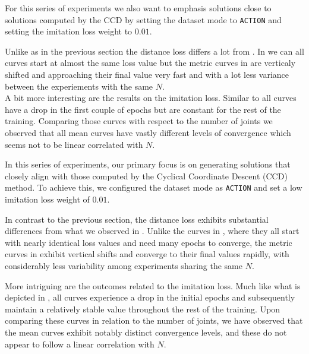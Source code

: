 For this series of experiments we also want to emphasis solutions close to solutions computed by the CCD by setting the dataset mode to \texttt{ACTION} and setting the imitation loss weight to $0.01$. 

Unlike as in the previous section the distance loss differs a lot from . In  we can all curves start at almost the same loss value but the metric curves in  are verticaly shifted and approaching their final value very fast and with a lot less variance between the experiements with the same $N$.\\
A bit more interesting are the results on the imitation loss. Similar to  all curves have a drop in the first couple of epochs but are constant for the rest of the training. Comparing those curves with respect to the number of joints we observed that all mean curves have vastly different levels of convergence which seems not to be linear correlated with $N$.


In this series of experiments, our primary focus is on generating solutions that closely align with those computed by the Cyclical Coordinate Descent (CCD) method. To achieve this, we configured the dataset mode as \texttt{ACTION} and set a low imitation loss weight of $0.01$.

In contrast to the previous section, the distance loss exhibits substantial differences from what we observed in . Unlike the curves in , where they all start with nearly identical loss values and need many epochs to converge, the metric curves in  exhibit vertical shifts and converge to their final values rapidly, with considerably less variability among experiments sharing the same $N$.

More intriguing are the outcomes related to the imitation loss. Much like what is depicted in , all curves experience a drop in the initial epochs and subsequently maintain a relatively stable value throughout the rest of the training. Upon comparing these curves in relation to the number of joints, we have observed that the mean curves exhibit notably distinct convergence levels, and these do not appear to follow a linear correlation with $N$.


